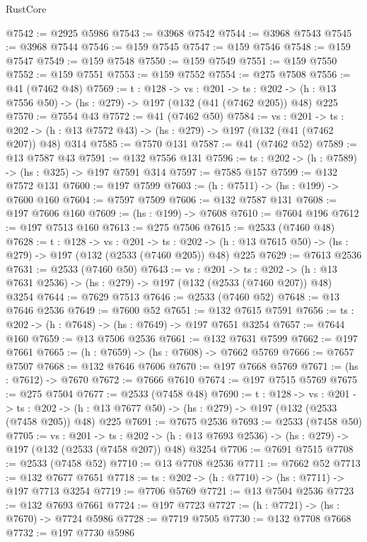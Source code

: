 \begin{lexlean}{RustCore}
\begin{coremodule}
@7542 := @2925 @5986
@7543 := @3968 @7542
@7544 := @3968 @7543
@7545 := @3968 @7544
@7546 := @159 @7545
@7547 := @159 @7546
@7548 := @159 @7547
@7549 := @159 @7548
@7550 := @159 @7549
@7551 := @159 @7550
@7552 := @159 @7551
@7553 := @159 @7552
@7554 := @275 @7508
@7556 := @41 (@7462 @48)
@7569 := {t : @128} ->
  {vs : @201} ->
  {ts : @202} -> (h : @13 @7556 @50) -> (hs : @279) -> @197 (@132 (@41 (@7462 @205)) @48) @225
@7570 := @7554 @43
@7572 := @41 (@7462 @50)
@7584 := {vs : @201} ->
  {ts : @202} -> (h : @13 @7572 @43) -> (hs : @279) -> @197 (@132 (@41 (@7462 @207)) @48) @314
@7585 := @7570 @131
@7587 := @41 (@7462 @52)
@7589 := @13 @7587 @43
@7591 := @132 @7556 @131
@7596 := {ts : @202} -> (h : @7589) -> (hs : @325) -> @197 @7591 @314
@7597 := @7585 @157
@7599 := @132 @7572 @131
@7600 := @197 @7599
@7603 := (h : @7511) -> (hs : @199) -> @7600 @160
@7604 := @7597 @7509
@7606 := @132 @7587 @131
@7608 := @197 @7606 @160
@7609 := (hs : @199) -> @7608
@7610 := @7604 @196
@7612 := @197 @7513 @160
@7613 := @275 @7506
@7615 := @2533 (@7460 @48)
@7628 := {t : @128} ->
  {vs : @201} ->
  {ts : @202} -> (h : @13 @7615 @50) -> (hs : @279) -> @197 (@132 (@2533 (@7460 @205)) @48) @225
@7629 := @7613 @2536
@7631 := @2533 (@7460 @50)
@7643 := {vs : @201} ->
  {ts : @202} -> (h : @13 @7631 @2536) -> (hs : @279) -> @197 (@132 (@2533 (@7460 @207)) @48) @3254
@7644 := @7629 @7513
@7646 := @2533 (@7460 @52)
@7648 := @13 @7646 @2536
@7649 := @7600 @52
@7651 := @132 @7615 @7591
@7656 := {ts : @202} -> (h : @7648) -> (hs : @7649) -> @197 @7651 @3254
@7657 := @7644 @160
@7659 := @13 @7506 @2536
@7661 := @132 @7631 @7599
@7662 := @197 @7661
@7665 := (h : @7659) -> (hs : @7608) -> @7662 @5769
@7666 := @7657 @7507
@7668 := @132 @7646 @7606
@7670 := @197 @7668 @5769
@7671 := (hs : @7612) -> @7670
@7672 := @7666 @7610
@7674 := @197 @7515 @5769
@7675 := @275 @7504
@7677 := @2533 (@7458 @48)
@7690 := {t : @128} ->
  {vs : @201} ->
  {ts : @202} -> (h : @13 @7677 @50) -> (hs : @279) -> @197 (@132 (@2533 (@7458 @205)) @48) @225
@7691 := @7675 @2536
@7693 := @2533 (@7458 @50)
@7705 := {vs : @201} ->
  {ts : @202} -> (h : @13 @7693 @2536) -> (hs : @279) -> @197 (@132 (@2533 (@7458 @207)) @48) @3254
@7706 := @7691 @7515
@7708 := @2533 (@7458 @52)
@7710 := @13 @7708 @2536
@7711 := @7662 @52
@7713 := @132 @7677 @7651
@7718 := {ts : @202} -> (h : @7710) -> (hs : @7711) -> @197 @7713 @3254
@7719 := @7706 @5769
@7721 := @13 @7504 @2536
@7723 := @132 @7693 @7661
@7724 := @197 @7723
@7727 := (h : @7721) -> (hs : @7670) -> @7724 @5986
@7728 := @7719 @7505
@7730 := @132 @7708 @7668
@7732 := @197 @7730 @5986

\end{coremodule}
\end{lexlean}
